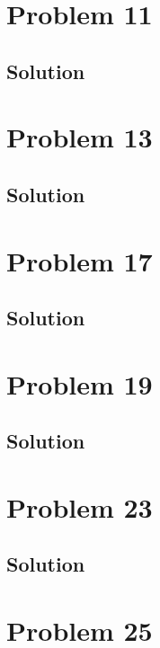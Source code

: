 \documentclass[12pt]{article}
\begin{document}
    \pagebreak
    \section{Problem 11}

        \subsection{Solution}

    \pagebreak
    \section{Problem 13}

        \subsection{Solution}

    \pagebreak
    \section{Problem 17}

        \subsection{Solution}

    \pagebreak
    \section{Problem 19}

        \subsection{Solution}

    \pagebreak
    \section{Problem 23}

        \subsection{Solution}

    \pagebreak
    \section{Problem 25}
\end{document}
